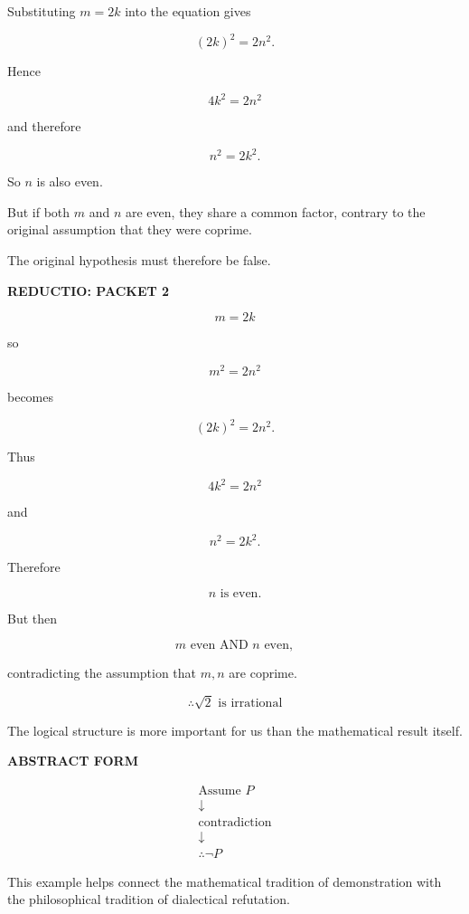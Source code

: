 \documentclass[11pt]{article}
\begin{document}
Substituting \(m=2k\) into the equation gives

\[
(2k)^2=2n^2.
\]

Hence

\[
4k^2=2n^2
\]

and therefore

\[
n^2=2k^2.
\]

So \(n\) is also even.

But if both \(m\) and \(n\) are even, they share a common factor,
contrary to the original assumption that they were coprime.

The original hypothesis must therefore be false.

\begin{whiteboard}
\textbf{REDUCTIO: PACKET 2}

\[
m=2k
\]

so

\[
m^2=2n^2
\]

becomes

\[
(2k)^2=2n^2.
\]

Thus

\[
4k^2=2n^2
\]

and

\[
n^2=2k^2.
\]

Therefore

\[
n\text{ is even}.
\]

But then

\[
m\text{ even AND }n\text{ even},
\]

contradicting the assumption that \(m,n\) are coprime.

\[
\boxed{\therefore \sqrt{2}\text{ is irrational}}
\]
\end{whiteboard}

The logical structure is more important for us than the
mathematical result itself.

\begin{whiteboard}
\textbf{ABSTRACT FORM}

\[
\begin{array}{c}
\text{Assume }P\\
\downarrow\\
\text{contradiction}\\
\downarrow\\
\therefore \neg P
\end{array}
\]
\end{whiteboard}

This example helps connect the mathematical tradition of
demonstration with the philosophical tradition of dialectical
refutation.
\end{document}
